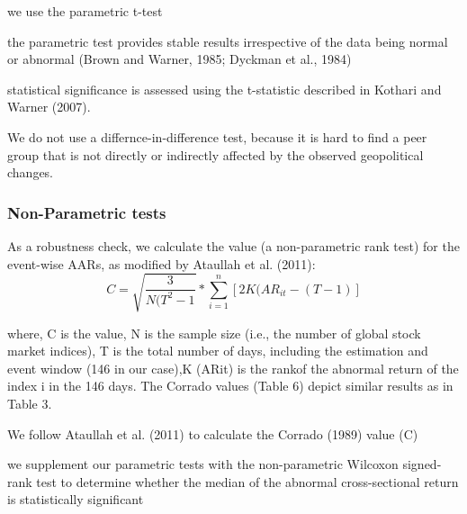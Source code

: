 \documentclass[12pt,a4paper]{article}
\begin{document}
we use the parametric t-test \citep[p.~8]{kiesel_should_2023}

the parametric test provides stable results irrespective of the data being normal or abnormal (Brown and Warner, 1985; Dyckman et al., 1984) \citep[p.~10]{kumari_are_2023}

statistical significance is assessed using the t-statistic described in Kothari and Warner (2007). \citep[p.~499]{omar_diversifying_2017}


We do not use a differnce-in-difference test, because it is hard to find a peer group that is not directly or indirectly affected by the observed geopolitical changes.  

\subsubsection{Non-Parametric tests}
As a robustness check, we calculate the \cite{corrado_nonparametric_1989} value (a non-parametric rank test) for the event-wise AARs, as modified by Ataullah et al. (2011): 
\begin{equation}
    C = \sqrt{\frac{3}{N(T^2-1}}*\sum_{i=1}^{n} [2K(AR_{it} - (T-1)] 
\end{equation}

where, C is the \cite{corrado_nonparametric_1989} value, N is the sample size (i.e., the number of global stock market indices), T is the total number of days, including the estimation and event window (146 in our case),K (ARit) is the rankof the abnormal return of the index i in the 146 days. The Corrado values (Table 6) depict similar results as in Table 3. \citep[p.~8]{boubaker_heterogeneous_2022}

We follow Ataullah et al. (2011) to calculate the Corrado (1989) value (C) \citep[p.~3]{hassan_border_2022}

we supplement our parametric tests with the non-parametric Wilcoxon signed-rank test to determine whether the median of the abnormal cross-sectional return is statistically significant \citep[p.~5]{kamal_impact_2023}
\end{document}
